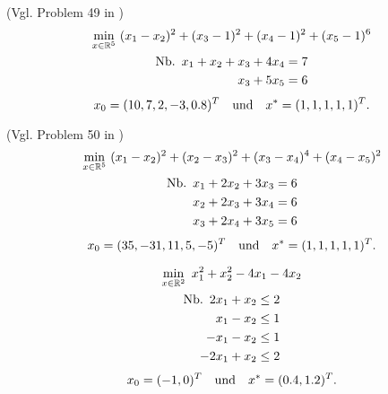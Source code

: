 \begin{testproblem}
(Vgl. Problem 49 in \cite[S.~72]{hock})
\begin{gather}
\min_{x\in\R^5}\ (x_1-x_2)^2 + (x_3-1)^2 + (x_4-1)^2 + (x_5-1)^6  \notag \\
\begin{split}
\nb x_1 + x_2 + x_3 + 4 x_4 & = 7 \\
x_3 + 5 x_5 & = 6 \\
\end{split}
\end{gather}
\begin{equation*}
x_0 = (10, 7, 2, -3, 0.8)^T \quad\text{und}\quad x^* = (1, 1, 1, 1, 1)^T.
\end{equation*}
\end{testproblem}

\begin{testproblem}
(Vgl. Problem 50 in \cite[S.~73]{hock})
\begin{gather}
\min_{x\in\R^5}\ (x_1-x_2)^2 + (x_2-x_3)^2 + (x_3-x_4)^4 + (x_4-x_5)^2  \notag \\
\begin{split}
\nb x_1 + 2 x_2 + 3 x_3 & = 6 \\
x_2 + 2 x_3 + 3 x_4 & = 6 \\
x_3 + 2 x_4 + 3 x_5 & = 6 \\
\end{split}
\end{gather}
\begin{equation*}
x_0 = (35, -31, 11, 5, -5)^T \quad\text{und}\quad x^* = (1, 1, 1, 1, 1)^T.
\end{equation*}
\end{testproblem}

\begin{testproblem}
\begin{gather}
\min_{x\in\R^2}\ x_1^2 + x_2^2 - 4 x_1 - 4 x_2 \notag \\
\begin{split}
\nb 2 x_1 + x_2 & \leq 2 \\
x_1 - x_2 & \leq 1 \\
-x_1 - x_2 & \leq 1 \\
-2 x_1 + x_2 & \leq 2 \\
\end{split}
\end{gather}
\begin{equation*}
x_0 = (-1, 0)^T \quad\text{und}\quad x^* = (0.4, 1.2)^T.
\end{equation*}
\end{testproblem}

